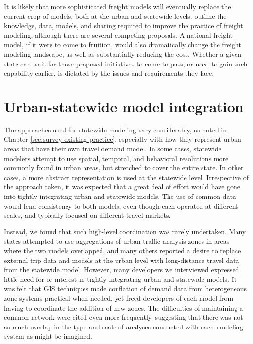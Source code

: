 It is likely that more sophisticated freight models will eventually replace the current crop of models, both at the urban and statewide levels. \cite{chase13} outline the knowledge, data, models, and sharing required to improve the practice of freight modeling, although there are several competing proposals. A national freight model, if it were to come to fruition, would also dramatically change the freight modeling landscape, as well as substantially reducing the cost. Whether a given state can wait for those proposed initiatives to come to pass, or need to gain such capability earlier, is dictated by the issues and requirements they face.

\section{Urban-statewide model integration}\label{sec:urban-statewide-integration}

The approaches used for statewide modeling vary considerably, as noted in Chapter \ref{sec:survey-existing-practice}, especially with how they represent urban areas that have their own travel demand model. In some cases, statewide modelers attempt to use spatial, temporal, and behavioral resolutions more commonly found in urban areas, but stretched to cover the entire state. In other cases, a more abstract representation is used at the statewide level. Irrespective of the approach taken, it was expected that a great deal of effort would have gone into tightly integrating urban and statewide models. The use of common data would lend consistency to both models, even though each operated at different scales, and typically focused on different travel markets.

Instead, we found that such high-level coordination was rarely undertaken. Many states attempted to use aggregations of urban traffic analysis zones in areas where the two models overlapped, and many others reported a desire to replace external trip data and models at the urban level with long-distance travel data from the statewide model. However, many developers we interviewed expressed little need for or interest in tightly integrating urban and statewide models. It was felt that GIS techniques made conflation of demand data from heterogeneous zone systems practical when needed, yet freed developers of each model from having to coordinate the addition of new zones. The difficulties of maintaining a common network were cited even more frequently, suggesting that there was not as much overlap in the type and scale of analyses conducted with each modeling system as might be imagined. 

